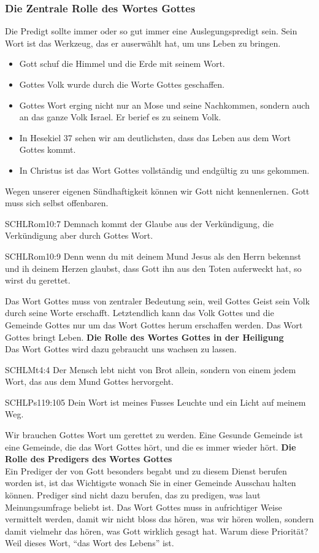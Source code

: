 \documentclass{../../inc/mybib}
\begin{document}
\subsubsection*{Die Zentrale Rolle des Wortes Gottes}
Die Predigt sollte immer oder so gut immer eine Auslegungspredigt sein. Sein Wort ist das Werkzeug, das er auserwählt hat, um uns Leben zu bringen.
\begin{itemize}
    \item Gott schuf die Himmel und die Erde mit seinem Wort.
    \item Gottes Volk wurde durch die Worte Gottes geschaffen.
    \item Gottes Wort erging nicht nur an Mose und seine Nachkommen, sondern auch an das ganze Volk Israel. Er berief es zu seinem Volk.
    \item In Hesekiel 37 sehen wir am deutlichsten, dass das Leben aus dem Wort Gottes kommt.
    \item In Christus ist das Wort Gottes vollständig und endgültig zu uns gekommen.
\end{itemize}
Wegen unserer eigenen Sündhaftigkeit können wir Gott nicht kennenlernen. Gott muss sich selbst offenbaren.
\begin{bibelbox}{SCHL}{Rom}{10:7}
    Demnach kommt der Glaube aus der Verkündigung, die Verkündigung aber durch Gottes Wort.
\end{bibelbox}
\begin{bibelbox}{SCHL}{Rom}{10:9}
    Denn wenn du mit deinem Mund Jesus als den Herrn bekennst und ih deinem Herzen glaubst, dass Gott ihn aus den Toten auferweckt hat, so wirst du gerettet.
\end{bibelbox}
Das Wort Gottes muss von zentraler Bedeutung sein, weil Gottes Geist sein Volk durch seine Worte erschafft. Letztendlich kann das Volk Gottes und die Gemeinde Gottes nur um das Wort Gottes herum erschaffen werden. Das Wort Gottes bringt Leben.
\textbf{Die Rolle des Wortes Gottes in der Heiligung}\\
Das Wort Gottes wird dazu gebraucht uns wachsen zu lassen.
\begin{bibelbox}{SCHL}{Mt}{4:4}
    Der Mensch lebt nicht von Brot allein, sondern von einem jedem Wort, das aus dem Mund Gottes hervorgeht.
\end{bibelbox}
\begin{bibelbox}{SCHL}{Ps}{119:105}
    Dein Wort ist meines Fusses Leuchte und ein Licht auf meinem Weg.
\end{bibelbox}
Wir brauchen Gottes Wort um gerettet zu werden. Eine Gesunde Gemeinde ist eine Gemeinde, die das Wort Gottes hört, und die es immer wieder hört.
\textbf{Die Rolle des Predigers des Wortes Gottes}\\
Ein Prediger der von Gott besonders begabt und zu diesem Dienst berufen worden ist, ist das Wichtigste wonach Sie in einer Gemeinde Ausschau halten können. Prediger sind nicht dazu berufen, das zu predigen, was laut Meinungsumfrage beliebt ist. Das Wort Gottes muss in aufrichtiger Weise vermittelt werden, damit wir nicht bloss das hören, was wir hören wollen, sondern damit vielmehr das hören, was Gott wirklich gesagt hat. Warum diese Priorität? Weil dieses Wort, \enquote{das Wort des Lebens} ist.
\end{document}
